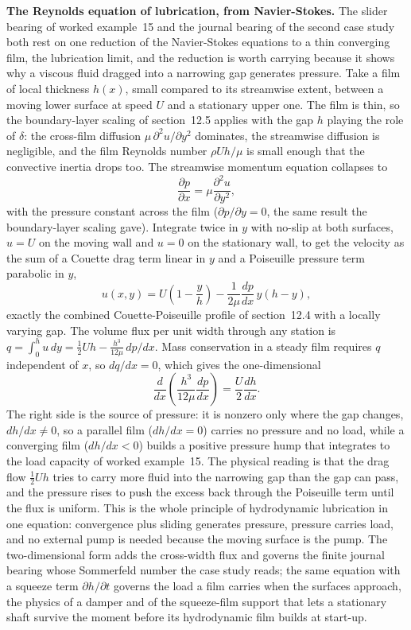\begin{mastery}
\textbf{The Reynolds equation of lubrication, from Navier-Stokes.} The
slider bearing of worked example~15 and the journal bearing of the
second case study both rest on one reduction of the Navier-Stokes
equations to a thin converging film, the lubrication limit, and the
reduction is worth carrying because it shows why a viscous fluid
dragged into a narrowing gap generates pressure. Take a film of local
thickness $h(x)$, small compared to its streamwise extent, between a
moving lower surface at speed $U$ and a stationary upper one. The film
is thin, so the boundary-layer scaling of section~12.5 applies with the
gap $h$ playing the role of $\delta$: the cross-film diffusion
$\mu\,\partial^2 u/\partial y^2$ dominates, the streamwise diffusion is
negligible, and the film Reynolds number $\rho U h/\mu$ is small enough
that the convective inertia drops too. The streamwise momentum equation
collapses to
\[
\frac{\partial p}{\partial x} = \mu\frac{\partial^2 u}{\partial y^2},
\]
with the pressure constant across the film ($\partial p/\partial y = 0$,
the same result the boundary-layer scaling gave). Integrate twice in
$y$ with no-slip at both surfaces, $u = U$ on the moving wall and
$u = 0$ on the stationary wall, to get the velocity as the sum of a
Couette drag term linear in $y$ and a Poiseuille pressure term
parabolic in $y$,
\[
u(x,y) = U\!\left(1 - \frac{y}{h}\right) - \frac{1}{2\mu}\frac{dp}{dx}
\,y(h - y),
\]
exactly the combined Couette-Poiseuille profile of section~12.4 with a
locally varying gap. The volume flux per unit width through any
station is $q = \int_0^h u\,dy = \tfrac12 U h - \tfrac{h^3}{12\mu}
\,dp/dx$. Mass conservation in a steady film requires $q$ independent
of $x$, so $dq/dx = 0$, which gives the one-dimensional 
\[
\frac{d}{dx}\!\left(\frac{h^3}{12\mu}\frac{dp}{dx}\right) =
\frac{U}{2}\frac{dh}{dx}.
\]
The right side is the source of pressure: it is nonzero only where the
gap changes, $dh/dx\neq0$, so a parallel film ($dh/dx = 0$) carries no
pressure and no load, while a converging film ($dh/dx < 0$) builds a
positive pressure hump that integrates to the load capacity of worked
example~15. The physical reading is that the drag flow $\tfrac12 U h$
tries to carry more fluid into the narrowing gap than the gap can pass,
and the pressure rises to push the excess back through the Poiseuille
term until the flux is uniform. This is the whole principle of
hydrodynamic lubrication in one equation: convergence plus sliding
generates pressure, pressure carries load, and no external pump is
needed because the moving surface is the pump. The two-dimensional form
adds the cross-width flux and governs the finite journal bearing whose
Sommerfeld number the case study reads; the same equation with a
squeeze term $\partial h/\partial t$ governs the load a film carries
when the surfaces approach, the physics of a damper and of the
squeeze-film support that lets a stationary shaft survive the moment
before its hydrodynamic film builds at start-up.
\end{mastery}

